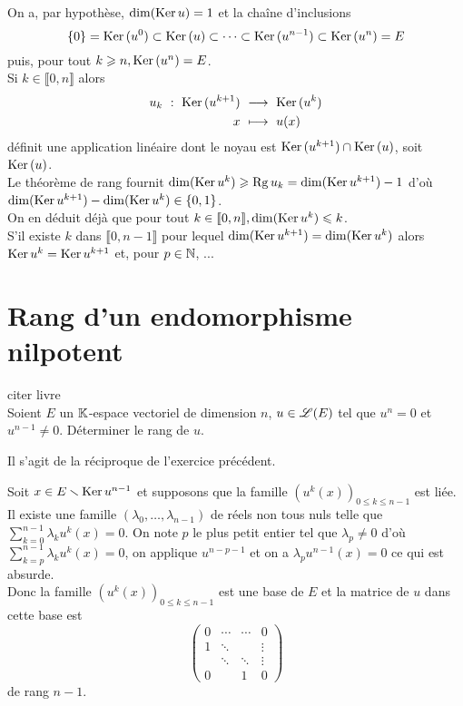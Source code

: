 \begin{solution}
    On a, par hypothèse, $\dim(\mathrm{Ker}\, u) = 1$ et la chaîne d'inclusions
    $$\{0\} = \mathrm{Ker}\,(u^0) \subset \mathrm{Ker}\,(u) \subset \cdots \subset \mathrm{Ker}\,(u^{n-1}) \subset \mathrm{Ker}\,(u^n) = E$$
    puis, pour tout $k \geqslant n, \mathrm{Ker}\,(u^n) = E$. \\
    Si $k \in \llbracket 0, n \rrbracket$ alors 
    \begin{alignat*}{2}
        u_k\ :\ \mathrm{Ker}\,(u^{k+1})\ &\longrightarrow\ \mathrm{Ker}\,(u^k)\\
        x\ &\longmapsto\ u(x)
    \end{alignat*}
    définit une application linéaire dont le noyau est $\mathrm{Ker}\,(u^{k+1}) \cap \mathrm{Ker}\,(u)$, soit $\mathrm{Ker}\,(u)$. \\
    Le théorème de rang fournit $\dim(\mathrm{Ker}\, u^k) \geqslant \mathrm{Rg}\, u_k = \dim( \mathrm{Ker}\, u^{k+1}) - 1$ d'où $\dim(\mathrm{Ker}\, u^{k+1}) - \dim(\mathrm{Ker}\, u^k) \in \{ 0, 1 \}$. \\
    On en déduit déjà que pour tout $k \in \llbracket 0, n \rrbracket, \dim(\mathrm{Ker}\, u^k) \leqslant k$. \\
    S'il existe $k$ dans $\llbracket 0, n-1 \rrbracket$ pour lequel $\dim( \mathrm{Ker}\, u^{k+1}) = \dim(\mathrm{Ker}\, u^k)$ alors $\mathrm{Ker}\, u^k = \mathrm{Ker}\, u^{k+1}$ et, pour $p \in \mathbb{N}$, 
    ...
\end{solution}

\section{Rang d'un endomorphisme nilpotent}
\begin{exercice}
    citer livre \\
    Soient $E$ un $\mathbb{K}$-espace vectoriel de dimension $n$, $u \in \mathscr{L}(E)$ tel que $u^n = 0$ et $u^{n-1} \not= 0$. Déterminer le rang de $u$.
\end{exercice}

Il s'agit de la réciproque de l'exercice précédent.

\begin{solution}
    Soit $x \in E \smallsetminus \mathrm{Ker}\, u^{n-1}$ et supposons que la famille $\left( u^k(x)\right)_{0 \leqslant k \leqslant n-1}$ est liée. Il existe une famille $(\lambda_0, \dots, \lambda_{n-1})$ de réels non tous nuls telle que $\sum\limits_{k=0}^{n-1} \lambda_k u^k(x) = 0$. On note $p$ le plus petit entier tel que $\lambda_p \not= 0$ d'où $\sum\limits_{k=p}^{n-1} \lambda_k u^k(x) = 0$, on applique $u^{n-p-1}$ et on a $\lambda_p u^{n-1}(x) = 0$ ce qui est absurde. \\
    Donc la famille $\left( u^k(x)\right)_{0 \leqslant k \leqslant n-1}$ est une base de $E$ et la matrice de $u$ dans cette base est 
    $$
    \begin{pmatrix}
        0 & \cdots & \cdots & 0 \\
        1 & \ddots & & \vdots \\
        & \ddots & \ddots & \vdots \\
        0 & & 1 & 0
    \end{pmatrix}
    $$
    de rang $n-1$.
\end{solution}